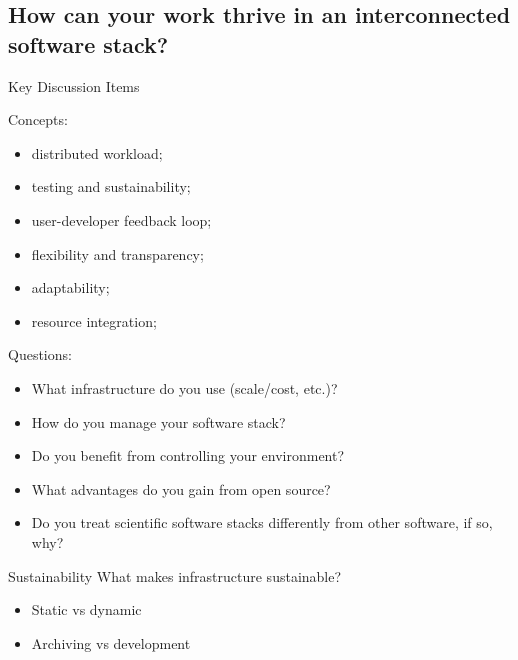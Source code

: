 		\subsection{How can your work thrive in an interconnected software stack?}
			\begin{frame}{Key Discussion Items}
				\begin{minipage}{.35\textwidth}
					Concepts:
					\begin{itemize}
						\item distributed workload;
						\item testing and sustainability;
						\item user-developer feedback loop;
						\item flexibility and transparency;
						\item adaptability;
						\item resource integration;
					\end{itemize}
				\end{minipage}
				\begin{minipage}{.56\textwidth}
					Questions:
					\begin{itemize}
						\item What infrastructure do you use (scale/cost, etc.)?
						\item How do you manage your software stack?
						\item Do you benefit from controlling your environment?
						\item What advantages do you gain from open source?
						\item Do you treat scientific software stacks differently from other software, if so, why?
					\end{itemize}
				\end{minipage}
			\end{frame}
			\begin{frame}{Sustainability}
				What makes infrastructure sustainable?
				\begin{itemize}
					\item Static vs dynamic
					\item Archiving vs development
				\end{itemize}
			\end{frame}

